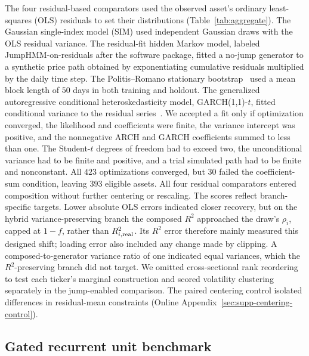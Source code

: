 The four residual-based comparators used the observed asset's
ordinary least-squares (OLS) residuals to set their distributions
(Table~\ref{tab:aggregate}). The Gaussian single-index model (SIM)
used independent Gaussian draws with the OLS residual variance. The
residual-fit hidden Markov model, labeled JumpHMM-on-residuals after
the software package, fitted a no-jump generator to a synthetic price
path obtained by exponentiating cumulative residuals multiplied by
the daily time step. The
Politis--Romano stationary bootstrap~\cite{politisRomano1994} used a
mean block length of $50$ days in both training and holdout. The
generalized autoregressive conditional heteroskedasticity model,
GARCH(1,1)-$t$, fitted conditional variance to the residual
series~\cite{bollerslev1986}. We accepted a fit only if optimization
converged, the likelihood and coefficients were finite, the variance
intercept was positive, and the nonnegative ARCH and GARCH
coefficients summed to less than one. The Student-$t$ degrees of
freedom had to exceed two, the unconditional variance had to be finite
and positive, and a trial simulated path had to be finite and
nonconstant. All $423$ optimizations converged, but $30$ failed the
coefficient-sum condition, leaving $393$ eligible assets. All four residual
comparators entered composition without further centering or
rescaling.
The scores reflect branch-specific targets. Lower absolute OLS errors indicated closer
recovery, but on the hybrid variance-preserving branch the composed
$R^2$ approached the draw's $\rho_i$, capped at $1-f$, rather than
$R^2_{i,\mathrm{real}}$. Its $R^2$ error therefore mainly measured this
designed shift; loading error also included any change made by
clipping. A composed-to-generator variance ratio of one indicated
equal variances, which the $R^2$-preserving branch did not target.
 We omitted cross-sectional
rank reordering to test each ticker's marginal construction and
scored volatility clustering separately in the jump-enabled comparison.
The paired centering control isolated differences in residual-mean
constraints (Online Appendix~\ref{sec:supp-centering-control}).

\subsection{Gated recurrent unit benchmark}
\label{sec:supp-gru}

